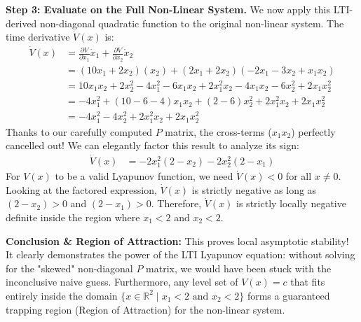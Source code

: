\documentclass[twoside, 11pt]{article}
\begin{document}
\textbf{Step 3: Evaluate on the Full Non-Linear System.}
We now apply this LTI-derived non-diagonal quadratic function to the original non-linear system. The time derivative $\dot{V}(x)$ is:
%
\begin{align*}
\dot{V}(x) &= \frac{\partial V}{\partial x_1} \dot{x}_1 + \frac{\partial V}{\partial x_2} \dot{x}_2 \\
&= (10x_1 + 2x_2) (x_2) + (2x_1 + 2x_2) (-2x_1 - 3x_2 + x_1 x_2) \\
&= 10x_1 x_2 + 2x_2^2 - 4x_1^2 - 6x_1 x_2 + 2x_1^2 x_2 - 4x_1 x_2 - 6x_2^2 + 2x_1 x_2^2 \\
&= -4x_1^2 + (10 - 6 - 4)x_1 x_2 + (2 - 6)x_2^2 + 2x_1^2 x_2 + 2x_1 x_2^2 \\
&= -4x_1^2 - 4x_2^2 + 2x_1^2 x_2 + 2x_1 x_2^2
\end{align*}
%
Thanks to our carefully computed $P$ matrix, the cross-terms ($x_1 x_2$) perfectly cancelled out! We can elegantly factor this result to analyze its sign:
%
\begin{align*}
\dot{V}(x) &= -2x_1^2 (2 - x_2) - 2x_2^2 (2 - x_1)
\end{align*}
%
For $V(x)$ to be a valid Lyapunov function, we need $\dot{V}(x) < 0$ for all $x \neq 0$. 
Looking at the factored expression, $\dot{V}(x)$ is strictly negative as long as $(2 - x_2) > 0$ and $(2 - x_1) > 0$. 
Therefore, $\dot{V}(x)$ is strictly locally negative definite inside the region where $x_1 < 2$ and $x_2 < 2$.

\textbf{Conclusion \& Region of Attraction:}
This proves local asymptotic stability! It clearly demonstrates the power of the LTI Lyapunov equation: without solving for the "skewed" non-diagonal $P$ matrix, we would have been stuck with the inconclusive naive guess. Furthermore, any level set of $V(x) = c$ that fits entirely inside the domain $\{x \in \mathbb{R}^2 \mid x_1 < 2 \text{ and } x_2 < 2\}$ forms a guaranteed trapping region (Region of Attraction) for the non-linear system.
\end{document}
